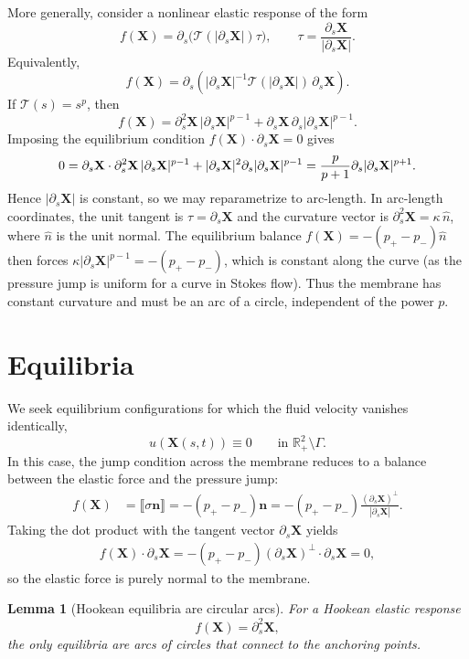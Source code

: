 \documentclass{amsart}
\newcommand{\mX}{\mathbf{X}}
\newcommand{\mn}{\mathbf{n}}
\newcommand{\jump}[1]{\llbracket{#1}\rrbracket}
\newtheorem{lemma}[theorem]{Lemma}
\begin{document}
More generally, consider a nonlinear elastic response of the form
\[
f(\mX)
= \partial_s \bigl(\mathcal{T}(|\partial_s \mX|)\tau\bigr),
\qquad
\tau=\frac{\partial_s \mX}{|\partial_s \mX|}.
\]
Equivalently,
\[
f(\mX)
= \partial_s\!\left(
|\partial_s \mX|^{-1}\mathcal{T}(|\partial_s \mX|)
\,\partial_s \mX
\right).
\]
If $\mathcal{T}(s)=s^p$, then
\[
f(\mX)
= \partial_s^2 \mX\,|\partial_s \mX|^{p-1}
+ \partial_s \mX\,\partial_s |\partial_s \mX|^{p-1}.
\]
Imposing the equilibrium condition
$f(\mX)\cdot\partial_s \mX=0$ gives
\[
0
= \partial_s \mX\cdot \partial_s^2 \mX\,|\partial_s \mX|^{p-1}
+ |\partial_s \mX|^2\partial_s |\partial_s \mX|^{p-1}
= {p \over p+1} \partial_s |\partial_s \mX|^{p+1}.
\]
Hence $|\partial_s \mX|$ is constant, so we may reparametrize to arc-length. In arc-length coordinates, the unit tangent is $\tau = \partial_s \mX$ and the curvature vector is $\partial_s^2 \mX = \kappa\,\hat{n}$, where $\hat{n}$ is the unit normal. The equilibrium balance $f(\mX) = -(p_+ - p_-)\hat{n}$ then forces $\kappa |\partial_s \mX|^{p-1} = -(p_+ - p_-)$, which is constant along the curve (as the pressure jump is uniform for a curve in Stokes flow). Thus the membrane has constant curvature and must be an arc of a circle, independent of the power $p$.




\section{Equilibria}\label{s:equilibria}

We seek equilibrium configurations for which the fluid velocity vanishes identically,
\[
u(\mX(s,t)) \equiv 0 \qquad \text{in } \mathbb{R}^2_+ \setminus \Gamma .
\]
In this case, the jump condition across the membrane reduces to a balance between the
elastic force and the pressure jump:
\begin{align*}
f(\mX)
&= \jump{\sigma \mn}
 = - (p_+ - p_-)\mn
 = - (p_+ - p_-)\frac{(\partial_s \mX)^\perp}{|\partial_s \mX|}.
\end{align*}
Taking the dot product with the tangent vector $\partial_s \mX$ yields
\begin{align*}
f(\mX)\cdot \partial_s \mX
= - (p_+ - p_-)(\partial_s \mX)^\perp \cdot \partial_s \mX
= 0,
\end{align*}
so the elastic force is purely normal to the membrane.

\begin{lemma}[Hookean equilibria are circular arcs]\label{lem:hookean_equilibria}
For a Hookean elastic response
\[
f(\mX) = \partial_s^2 \mX,
\]
the only equilibria are arcs of circles that connect to the anchoring points. 
\end{lemma}
\end{document}

